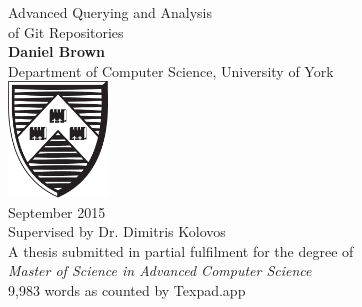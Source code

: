 \documentclass[11pt]{book}
\begin{document}
\begin{titlepage}
	\begin{center}
		{\huge Advanced Querying and Analysis\\ of Git Repositories\\}
		\vspace{1.5cm}
		{\Large \textbf{Daniel Brown} \\}
		{\Large Department of Computer Science, University of York \\}
		\vspace{1.5cm}
		\includegraphics[width=100px]{images/university-of-york-shield} \\
		\vspace{1.5cm}
		{\Large September 2015 \\}
		\vspace{1.5cm}
		\Large Supervised by Dr. Dimitris Kolovos \\
		\vspace{1.5cm}
		\Large A thesis submitted in partial fulfilment for the degree of \\ \textit{Master of Science in Advanced Computer Science}\\
		\vspace{5cm}
		\small 9,983 words as counted by Texpad.app
	\end{center}
	\restoregeometry
\end{titlepage}
\end{document}
